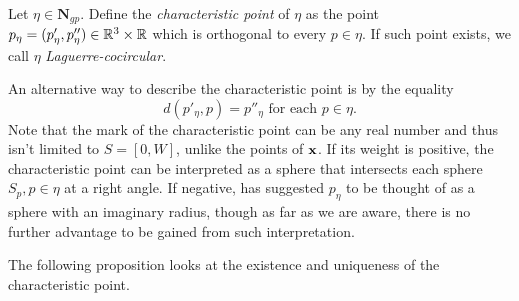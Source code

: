 \begin{definition}
	Let $\eta\in \mathbf N_{gp}$. Define the \textit{characteristic point} of $\eta$ as the point $p_{\eta} = (p'_\eta, p''_\eta) \in {\mathbb R^3} \times \mathbb R$ which is orthogonal to every $p\in \eta$. If such point exists, we call $\eta$ \textit{Laguerre-cocircular}. 
\end{definition}
An alternative way to describe the characteristic point is by the equality 
\begin{equation}\label{eq:charpoint}
	d(p'_\eta,p)=p''_\eta \text{ for each } p \in \eta.
\end{equation}
Note that the mark of the characteristic point can be any real number and thus isn't limited to $S=[0,W]$, unlike the points of ${\mathbf{x}}$.
If its weight is positive, the characteristic point can be interpreted as a sphere that intersects each sphere $S_p, p\in\eta$ at a right angle. If negative, \cite{Edelsbrunner1996} has suggested $p_\eta$ to be thought of as a sphere with an imaginary radius, though as far as we are aware, there is no further advantage to be gained from such interpretation. \newline

The following proposition looks at the existence and uniqueness of the characteristic point.


